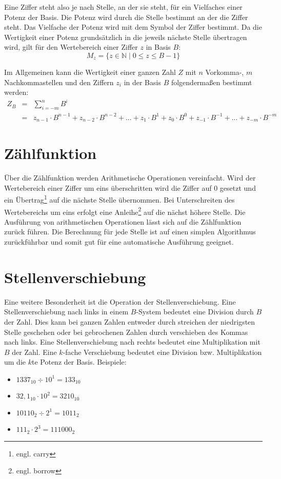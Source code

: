 Eine Ziffer steht also je nach Stelle, an der sie steht, für ein Vielfaches einer Potenz der Basis. Die Potenz wird durch die Stelle bestimmt an der die Ziffer steht. Das Vielfache der Potenz wird mit dem Symbol der Ziffer bestimmt. Da die Wertigkeit einer Potenz grundsätzlich in die jeweils nächste Stelle übertragen wird, gilt für den Wertebereich einer Ziffer $z$ in Basis $B$:
\[
	M_z = \{ z \in \mathbb{N} \mid 0 \le z \le B - 1 \}
\]

Im Allgemeinen kann die Wertigkeit einer ganzen Zahl $Z$ mit $n$ Vorkomma-, $m$ Nachkommastellen und den Ziffern $z_i$ in der Basis $B$ folgendermaßen bestimmt werden:
\begin{eqnarray*}
	Z_B & = & \sum_{i=-m}^n B^i \\
		& = & z_{n-1} \cdot B^{n-1} + z_{n-2} \cdot B^{n-2} + ... 
		+ z_1 \cdot B^1 + z_0 \cdot B^0 + z_{-1} \cdot B^{-1} 
		+ ... + z_{-m} \cdot B^{-m}
\end{eqnarray*}

\section{Zählfunktion}
\label{Zählfunktion} 
Über die Zählfunktion werden Arithmetische Operationen vereinfacht. Wird der Wertebereich einer Ziffer um eins überschritten wird die Ziffer auf $0$ gesetzt und ein Übertrag\footnote{engl. carry} auf die nächste Stelle übernommen. Bei Unterschreiten des Wertebereichs um eins erfolgt eine Anleihe\footnote{engl. borrow} auf die nächst höhere Stelle. Die Ausführung von arithmetischen Operationen lässt sich auf die Zählfunktion zurück führen. Die Berechnung für jede Stelle ist auf einen simplen Algorithmus zurückführbar und somit gut für eine automatische Ausführung geeignet.

\section{Stellenverschiebung}
\label{stellenverschiebung}
Eine weitere Besonderheit ist die Operation der Stellenverschiebung. Eine Stellenverschiebung nach links in einem $B$-System bedeutet eine Division durch $B$ der Zahl. Dies kann bei ganzen Zahlen entweder durch streichen der niedrigsten Stelle geschehen oder bei gebrochenen Zahlen durch verschieben des Kommas nach links. Eine Stellenverschiebung nach rechts bedeutet eine Multiplikation mit $B$ der Zahl. Eine $k$-fache Verschiebung bedeutet eine Division bzw. Multiplikation um die $k$te Potenz der Basis. Beispiele:
\begin{itemize}
	\item
	$1337_{10} \div 10^1 = 133_{10}$
	
	\item 
	$32,1_{10} \cdot 10^2 = 3210_{10}$
	
	\item
	$10110_2 \div 2^1 = 1011_2$
	
	\item
	$111_2 \cdot 2^3 = 111000_2$
\end{itemize}


